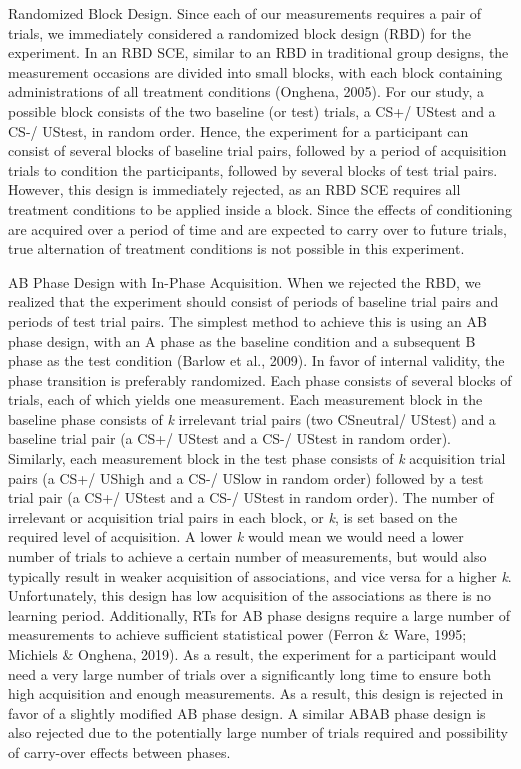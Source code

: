 \documentclass{article}
\begin{document}
Randomized Block Design. Since each of our measurements requires a pair of trials, we immediately considered a randomized block design (RBD) for the experiment. In an RBD SCE, similar to an RBD in traditional group designs, the measurement occasions are divided into small blocks, with each block containing administrations of all treatment conditions (Onghena, 2005). For our study, a possible block consists of the two baseline (or test) trials, a CS+/ UStest and a CS-/ UStest, in random order. Hence, the experiment for a participant can consist of several blocks of baseline trial pairs, followed by a period of acquisition trials to condition the participants, followed by several blocks of test trial pairs. However, this design is immediately rejected, as an RBD SCE requires all treatment conditions to be applied inside a block. Since the effects of conditioning are acquired over a period of time and are expected to carry over to future trials, true alternation of treatment conditions is not possible in this experiment. 

AB Phase Design with In-Phase Acquisition. When we rejected the RBD, we realized that the experiment should consist of periods of baseline trial pairs and periods of test trial pairs. The simplest method to achieve this is using an AB phase design, with an A phase as the baseline condition and a subsequent B phase as the test condition (Barlow et al., 2009). In favor of internal validity, the phase transition is preferably randomized. Each phase consists of several blocks of trials, each of which yields one measurement. Each measurement block in the baseline phase consists of \emph{k} irrelevant trial pairs (two CSneutral/ UStest) and a baseline trial pair (a CS+/ UStest and a CS-/ UStest in random order). Similarly, each measurement block in the test phase consists of \emph{k} acquisition trial pairs (a CS+/ UShigh and a CS-/ USlow in random order) followed by a test trial pair (a CS+/ UStest and a CS-/ UStest in random order). The number of irrelevant or acquisition trial pairs in each block, or \emph{k}, is set based on the required level of acquisition. A lower \emph{k} would mean we would need a lower number of trials to achieve a certain number of measurements, but would also typically result in weaker acquisition of associations, and vice versa for a higher \emph{k}. Unfortunately, this design has low acquisition of the associations as there is no learning period. Additionally, RTs for AB phase designs require a large number of measurements to achieve sufficient statistical power (Ferron \& Ware, 1995; Michiels \& Onghena, 2019). As a result, the experiment for a participant would need a very large number of trials over a significantly long time to ensure both high acquisition and enough measurements. As a result, this design is rejected in favor of a slightly modified AB phase design. A similar ABAB phase design is also rejected due to the potentially large number of trials required and possibility of carry-over effects between phases. 
\end{document}
